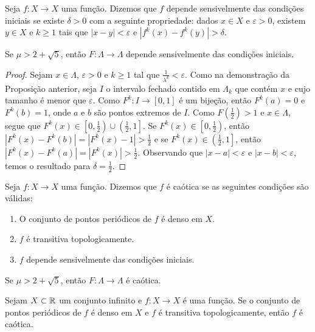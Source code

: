 \begin{definition}
Seja $f: X \to X$ uma função. Dizemos que $f$ depende sensivelmente das condições iniciais se existe $\delta > 0$ com a seguinte propriedade: dados $x \in X$ e $\varepsilon > 0$, existem $y \in X$ e $k \geq 1$ tais que $|x - y| < \varepsilon$ e $|f^k(x) - f^k(y)| > \delta$.
\end{definition}

\begin{proposition}
\label{proposicao caos 3}
Se $\mu > 2 + \sqrt{5}$, então $F: \Lambda \to \Lambda$ depende sensivelmente das condições iniciais.
\end{proposition}

\begin{proof}
Sejam $x \in \Lambda$, $\varepsilon > 0$ e $k \geq 1$ tal que $\frac{1}{\lambda^k} < \varepsilon$. Como na demonstração da Proposição anterior, seja $I$ o intervalo fechado contido em $\Lambda_k$ que contém $x$ e cujo tamanho é menor que $\varepsilon$. Como $F^k: I \to [0, 1]$ é um bijeção, então $F^k(a) = 0$ e  $F^k(b) = 1$, onde $a$ e $b$ são pontos extremos de $I$. Como $F(\frac{1}{2}) > 1$ e $x \in \Lambda$, segue que $F^{k}(x) \in \left[0, \frac{1}{2}\right) \cup \left(\frac{1}{2}, 1\right]$. Se $F^{k}(x) \in \left[0, \frac{1}{2}\right)$, então $|F^k(x) - F^k(b)| = |F^k(x) - 1| > \frac{1}{2}$ e se $F^{k}(x) \in \left(\frac{1}{2}, 1\right]$, então $|F^k(x) - F^k(a)| = |F^k(x)| > \frac{1}{2}$. Observando que $|x - a| < \varepsilon$ e  $|x - b| < \varepsilon$, temos o resultado para $\delta = \frac{1}{2}$. 
\end{proof}

\begin{definition}
Seja $f: X \to X$ uma função. Dizemos que $f$ é caótica se as seguintes condições são válidas:
\begin{enumerate}[label=\roman*.]
\item O conjunto de pontos periódicos de $f$ é denso em $X$.
\item $f$ é transitiva topologicamente.
\item $f$ depende sensivelmente das condições iniciais.
\end{enumerate}
\end{definition}

\begin{theorem} \label{teorema caos 1}
Se $\mu > 2 + \sqrt{5}$, então $F: \Lambda \to \Lambda$ é caótica.
\end{theorem}

\begin{theorem} \label{teorema caos 2}
Sejam $X \subset \mathbb{R}$ um conjunto infinito e $f: X \to X$ é uma função. Se o conjunto de pontos periódicos de $f$ é denso em $X$ e $f$ é transitiva topologicamente, então $f$ é caótica.
\end{theorem}

